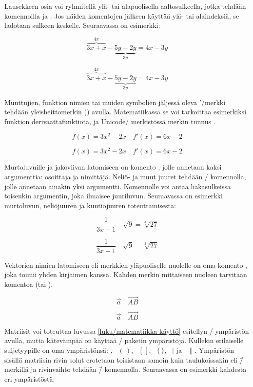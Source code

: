 \noindent
Lausekkeen osia voi ryhmitellä ylä- tai alapuolisella aaltosulkeella,
jotka tehdään komennoilla  ja .
Jos näiden komentojen jälkeen käyttää ylä- tai alaindeksiä, se ladotaan
sulkeen keskelle. Seuraavassa on esimerkki:

\begin{koodilohkosis}
\[ \overbrace{3x + x}^{4x} - \underbrace{5y - 2y}_{3y} = 4x - 3y \]
\end{koodilohkosis}
\[ \overbrace{3x + x}^{4x} - \underbrace{5y - 2y}_{3y} = 4x - 3y \]

\noindent
Muuttujien, funktion nimien tai muiden symbolien jäljessä oleva
$'$\=/merkki tehdään yleisheittomerkin () avulla.
Matematiikassa se voi tarkoittaa esimerkiksi funktion
derivaattafunktiota, ja Unicode\-/ merkistössä merkin tunnus
.

\begin{koodilohkosis}
\[ f(x) = 3x^2 - 2x \quad f'(x) = 6x - 2 \]
\end{koodilohkosis}
\[ f(x) = 3x^2 - 2x \quad f'(x) = 6x - 2 \]

\noindent
Murtoluvuille ja jakoviivan latomiseen on komento , jolle
annetaan kaksi argumenttia: osoittaja ja nimittäjä. Neliö- ja muut
juuret tehdään \-/ komennolla, jolle annetaan ainakin
yksi argumentti. Komennolle voi antaa hakasulkeissa toisenkin
argumentin, joka ilmaisee juuriluvun. Seuraavassa on esimerkki
murtoluvun, neliöjuuren ja kuutiojuuren toteuttamisesta:

\begin{koodilohkosis}
\[ \frac{1}{3x + 1} \quad \sqrt{9} = \sqrt[3]{27} \]
\end{koodilohkosis}
\[ \frac{1}{3x + 1} \quad \sqrt{9} = \sqrt[3]{27} \]

\noindent
Vektorien nimien latomiseen eli merkkien yläpuoliselle nuolelle on oma
komento , joka toimii yhden kirjaimen kanssa. Kahden
merkin mittaiseen nuoleen tarvitaan komentoa 
(tai ).

\begin{koodilohkosis}
\[ \vec{a} \quad \overrightarrow{AB} \]
\end{koodilohkosis}
\[ \vec{a} \quad \overrightarrow{AB} \]

\noindent
Matriisit voi toteuttaa luvussa \ref{luku/matematiikka-käyttö} esitellyn
\-/ ympäristön avulla, mutta kätevämpää on käyttää
\-/ paketin ympäristöjä. Kullekin erilaiselle
suljetyypille on oma ympäristönsä: ,
~$(\,)$, ~$[\,]$,
~$\{\,\}$, ~$|$ ja
~$\|$. Ympäristön sisällä matriisin rivin solut
erotetaan toisistaan samoin kuin taulukoissakin eli \koodi{\&}\=/
merkillä ja rivinvaihto tehdään \mkomento{\keno}\=/ komennolla.
Seuraavassa on esimerkki kahdesta eri ympäristöstä:

